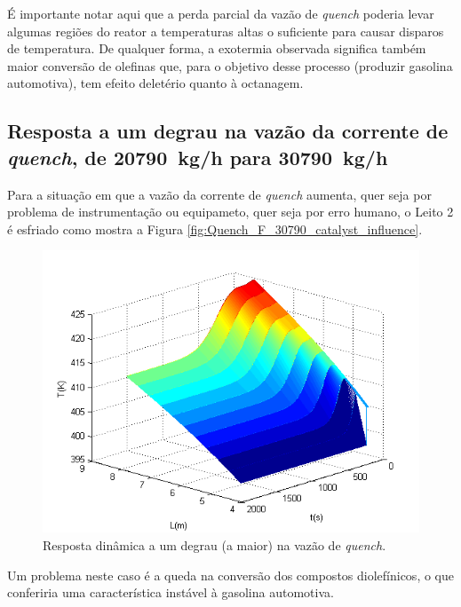 É importante notar aqui que a perda parcial da vazão de \emph{quench} poderia
levar algumas regiões do reator a temperaturas altas o suficiente para causar
disparos de temperatura. De qualquer forma, a exotermia observada significa
também maior conversão de olefinas que, para o objetivo desse processo (produzir
gasolina automotiva), tem efeito deletério quanto à octanagem.

\subsection{Resposta a um degrau na vazão da corrente de \emph{quench}, de
\SI{20790}{kg/h} para \SI{30790}{kg/h}} \label{sec:respostaaumdegrauvazao3}

Para a situação em que a vazão da corrente de \emph{quench} aumenta, quer seja
por problema de instrumentação ou equipameto, quer seja por erro humano, o Leito
2 é esfriado como mostra a Figura \autoref{fig:Quench_F_30790_catalyst_influence}.

\begin{figure}[htb]
\centering
\includegraphics[scale=0.8]{images/Chap4/Quench_F_30790_catalyst_influence.png}
\caption{Resposta dinâmica a um degrau (a maior) na vazão de \emph{quench}.}
\label{fig:Quench_F_30790_catalyst_influence}
\end{figure}

Um problema neste caso é a queda na conversão dos compostos diolefínicos, o
que conferiria uma característica instável à gasolina automotiva.